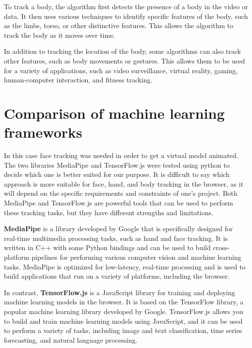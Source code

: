 To track a body, the algorithm first detects the presence of a body in the video or data.
It then uses various techniques to identify specific features of the body, such as the limbs, 
torso, or other distinctive features. This allows the algorithm to track the body as it moves over time. 

In addition to tracking the location of the body, some algorithms can also track 
other features, such as body movements or gestures. This allows them to be used for a 
variety of applications, such as video surveillance, virtual reality, gaming, human-computer 
interaction, and fitness tracking.

\section{Comparison of machine learning frameworks}
In this case face tracking was needed in order to get a virtual model animated. 
The two libraries MediaPipe and TensorFlow.js were tested using python to decide 
which one is better suited for our purpose. It is difficult to say which approach 
is more suitable for face, hand, and body tracking in the browser, as it will depend 
on the specific requirements and constraints of one's project. Both MediaPipe and 
TensorFlow.js are powerful tools that can be used to perform these tracking tasks, 
but they have different strengths and limitations.

\textbf{MediaPipe} is a library developed by Google that is specifically designed 
for real-time multimedia processing tasks, such as hand and face tracking. 
It is written in C++ with some Python bindings and can be used to build cross-platform 
pipelines for performing various computer vision and machine learning tasks. MediaPipe is 
optimized for low-latency, real-time processing and is used to build applications that run 
on a variety of platforms, including the browser. \cite{Mediapipe}

In contrast, \textbf{TensorFlow.js} is a JavaScript library for training and deploying machine 
learning models in the browser. It is based on the TensorFlow library, a popular machine 
learning library developed by Google. TensorFlow.js allows you to build and train machine 
learning models using JavaScript, and it can be used to perform a variety of tasks, including 
image and text classification, time series forecasting, and natural language processing. \cite{Tensorflow}

